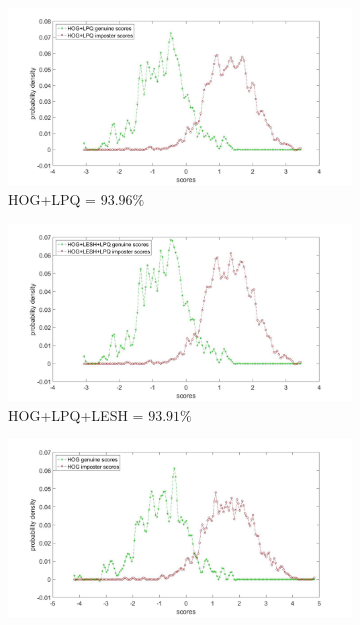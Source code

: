 \documentclass[english, 12pt]{article}
\begin{document}
\begin{figure}[H]
    \centering
    \begin{subfigure}[b]{0.44\textwidth}
        \includegraphics[width=\textwidth]{HOG+LPQ.jpg}
        \caption{HOG+LPQ = $93.96\%$}
        \label{fig:HOGLPQ}
    \end{subfigure}
    \begin{subfigure}[b]{0.44\textwidth}
        \includegraphics[width=\textwidth]{HOG+LPQ+LESH.jpg}
        \caption{HOG+LPQ+LESH = $93.91\%$}
        \label{fig:HOGLPQLESH}
    \end{subfigure}
    \begin{subfigure}[b]{0.44\textwidth}
        \includegraphics[width=\textwidth]{HOG.jpg}

\end{subfigure}
\end{figure}
\end{document}
